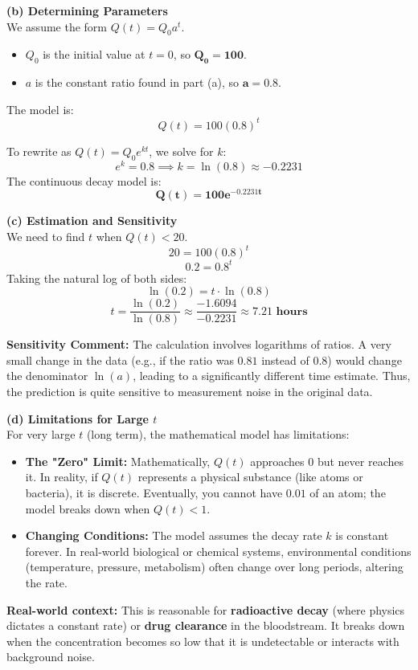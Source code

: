 \textbf{(b) Determining Parameters} \\
    We assume the form $Q(t) = Q_{0}a^{t}$.
    \begin{itemize}
        \item $Q_{0}$ is the initial value at $t=0$, so $\mathbf{Q_{0} = 100}$.
        \item $a$ is the constant ratio found in part (a), so $\mathbf{a = 0.8}$.
    \end{itemize}
    The model is: 
    \[ Q(t) = 100(0.8)^{t} \]
    
    To rewrite as $Q(t) = Q_{0}e^{kt}$, we solve for $k$:
    \[ e^k = 0.8 \implies k = \ln(0.8) \approx -0.2231 \]
    The continuous decay model is:
    \[ \mathbf{Q(t) = 100e^{-0.2231t}} \]

\textbf{(c) Estimation and Sensitivity} \\
    We need to find $t$ when $Q(t) < 20$.
    \[ 20 = 100(0.8)^{t} \]
    \[ 0.2 = 0.8^{t} \]
    Taking the natural log of both sides:
    \[ \ln(0.2) = t \cdot \ln(0.8) \]
    \[ t = \frac{\ln(0.2)}{\ln(0.8)} \approx \frac{-1.6094}{-0.2231} \approx \mathbf{7.21 \text{ hours}} \]
    
    \textbf{Sensitivity Comment:} The calculation involves logarithms of ratios. A very small change in the data (e.g., if the ratio was $0.81$ instead of $0.8$) would change the denominator $\ln(a)$, leading to a significantly different time estimate. Thus, the prediction is quite sensitive to measurement noise in the original data.

\textbf{(d) Limitations for Large $t$} \\
    For very large $t$ (long term), the mathematical model has limitations:
    \begin{itemize}
        \item \textbf{The "Zero" Limit:} Mathematically, $Q(t)$ approaches 0 but never reaches it. In reality, if $Q(t)$ represents a physical substance (like atoms or bacteria), it is discrete. Eventually, you cannot have $0.01$ of an atom; the model breaks down when $Q(t) < 1$.
        \item \textbf{Changing Conditions:} The model assumes the decay rate $k$ is constant forever. In real-world biological or chemical systems, environmental conditions (temperature, pressure, metabolism) often change over long periods, altering the rate.
    \end{itemize}
    
    \textbf{Real-world context:} This is reasonable for \textbf{radioactive decay} (where physics dictates a constant rate) or \textbf{drug clearance} in the bloodstream. It breaks down when the concentration becomes so low that it is undetectable or interacts with background noise.


